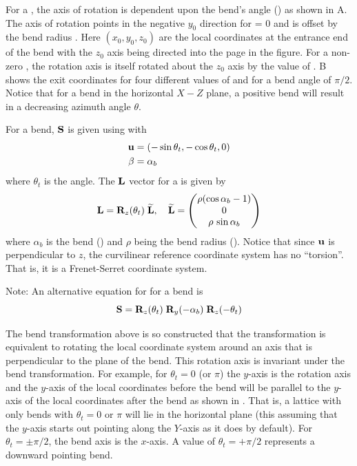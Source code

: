 
For a , the axis of rotation is dependent upon the bend's  angle
() as shown in A. The axis of rotation points in the
negative $y_0$ direction for  = 0 and is offset by the bend radius
. Here $(x_0, y_0, z_0)$ are the local coordinates at the entrance end of the bend
with the $z_0$ axis being directed into the page in the figure.  For a non-zero
, the rotation axis is itself rotated about the $z_0$ axis by the value of
. B shows the exit coordinates for four different values of
 and for a bend angle  of $\pi/2$.
Notice that for a bend in the horizontal $X-Z$ plane, a positive
bend  will result in a decreasing azimuth angle $\theta$.

For a bend, ${\bf S}$ is given using  with 
\begin{align}
  {\bf u} &= (-\sin\theta_t, -\cos\theta_t, 0) \nonumber \\
  \beta &= \alpha_b
  \label{ustt}
\end{align}
where $\theta_t$ is the  angle. The ${\bf L}$ vector for a  is given by 
\begin{equation}
  {\bf L} = {\bf R}_{z}(\theta_t) \; {\widetilde{\bf L}}, \quad
  {\widetilde{\bf L}} = 
  \begin{pmatrix}
    \rho (\cos\alpha_b - 1) \\ 0 \\ \rho \, \sin\alpha_b
  \end{pmatrix}
  \label{lrztt}
\end{equation}
where $\alpha_b$ is the bend  () and $\rho$ being the bend radius
(). Notice that since ${\bf u}$ is perpendicular to $z$, the curvilinear reference coordinate
system has no ``torsion''. That is, it is a Frenet-Serret coordinate system.

Note: An alternative equation for \vn{\bfS} for a bend is
 \begin{equation}
  {\bf S} = {\bf R}_{z}(\theta_t) \; {\bf R}_{y}(-\alpha_b) \; {\bf R}_{z}(-\theta_t)
  \label{srrr}
\end{equation}

The bend transformation above is so constructed that the
transformation is equivalent to rotating the local coordinate system
around an axis that is perpendicular to the plane of the bend. This
rotation axis is invariant under the bend transformation. For example,
for $\theta_t = 0$ (or $\pi$) the $y$-axis is the rotation axis and
the $y$-axis of the local coordinates before the bend will be parallel
to the $y$-axis of the local coordinates after the bend as shown in
. That is, a lattice with only bends with
$\theta_t = 0$ or $\pi$ will lie in the horizontal plane (this
assuming that the $y$-axis starts out pointing along the $Y$-axis as
it does by default).  For $\theta_t = \pm\pi/2$, the bend axis is the
$x$-axis. A value of $\theta_t = +\pi/2$ represents a downward
pointing bend.

